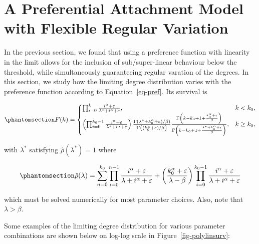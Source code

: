 \documentclass[
  sn-basic,
]{sn-jnl}
\theoremstyle{plain}
\theoremstyle{plain}
\theoremstyle{remark}
\begin{document}
\section{A Preferential Attachment Model with Flexible Regular
Variation}\label{sec-model}

In the previous section, we found that using a preference function with
linearity in the limit allows for the inclusion of sub/super-linear
behaviour below the threshold, while simultaneously guaranteeing regular
varation of the degrees. In this section, we study how the limiting
degree distribution varies with the preference function according to
Equation~\ref{eq-pref}. Its survival is

\begin{equation}\phantomsection\label{eq-polysurv}{
\bar F(k) = \begin{cases}
\prod_{i=0}^{k}\frac{i^\alpha + \varepsilon}{\lambda^*+i^\alpha + \varepsilon},&k<k_0,\\
\left(\prod_{i=0}^{k_0-1}\frac{i^\alpha + \varepsilon}{\lambda^*+i^\alpha + \varepsilon}\right)\frac{\Gamma(\lambda^*+k_0^\alpha + \varepsilon)/\beta)}{\Gamma\left((k_0^\alpha + \varepsilon)/\beta\right)} \frac{\Gamma\left(k-k_0 + 1 +\frac{k_0^\alpha + \varepsilon}{\beta}\right)}{\Gamma\left(k-k_0 + 1 +\frac{\lambda^* +k_0^\alpha + \varepsilon}{\beta}\right)},&k\ge k_0,
\end{cases}
}\end{equation}

with \(\lambda^*\) satisfying \(\hat \rho(\lambda^*)=1\) where

\begin{equation}\phantomsection\label{eq-rho}{
\hat\rho(\lambda) = \sum_{n=0}^{k_0}\prod_{i=0}^{n-1}\frac{i^\alpha + \varepsilon}{\lambda+i^\alpha + \varepsilon} + \left(\frac{k_0^\alpha + \varepsilon}{\lambda-\beta}\right)\prod_{i=0}^{k_0-1}\frac{i^\alpha + \varepsilon}{\lambda + i^\alpha + \varepsilon} 
}\end{equation}

which must be solved numerically for most parameter choices. Also, note
that \(\lambda>\beta\).

Some examples of the limiting degree distribution for various parameter
combinations are shown below on log-log scale in
Figure~\ref{fig-polylinsurv}:
\end{document}
